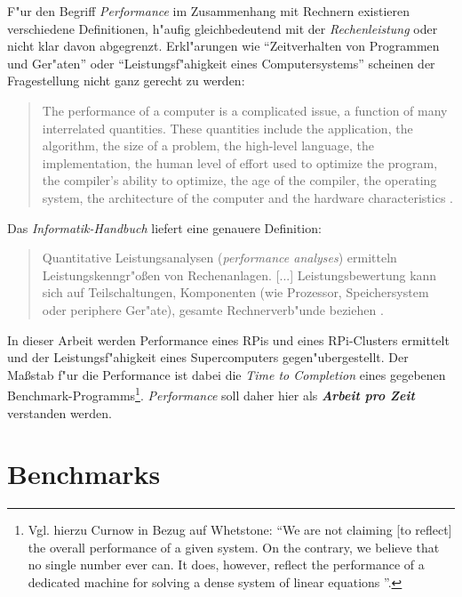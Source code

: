 F"ur den Begriff \textit{Performance} im Zusammenhang mit Rechnern existieren verschiedene Definitionen, h"aufig gleichbedeutend mit der \textit{Rechenleistung} oder nicht klar davon abgegrenzt. Erkl"arungen wie "`Zeitverhalten von Programmen und Ger"aten"' oder "`Leistungsf"ahigkeit eines Computersystems"' scheinen der Fragestellung nicht ganz gerecht zu werden: 
\begin{quote}
\onehalfspacing
The performance of a computer is a complicated issue, a function of many interrelated quantities. These quantities include the application, the algorithm, the size of a problem, the high-level language, the implementation, the human level of effort used to optimize the program, the compiler's ability to optimize, the age of the compiler, the operating system, the architecture of the computer and the hardware characteristics \cite{don03}.
\end{quote}
Das \textit{Informatik-Handbuch} liefert eine genauere Definition:
\begin{quote} 
\onehalfspacing
Quantitative Leistungsanalysen (\textit{performance analyses}) ermitteln Leistungskenngr"o\ss en von Rechenanlagen. [...] Leistungsbewertung kann sich auf Teilschaltungen, Komponenten (wie Prozessor, Speichersystem oder periphere Ger"ate), gesamte Rechnerverb"unde beziehen \cite{rec06}.
\end{quote}
In dieser Arbeit werden Performance eines RPis und eines RPi-Clusters ermittelt und der Leistungsf"ahigkeit eines Supercomputers gegen"ubergestellt. Der Ma\ss stab f"ur die Performance ist dabei die \textit{Time to Completion} eines gegebenen Benchmark-Programms\footnote{Vgl. hierzu Curnow in Bezug auf Whetstone: "`We are not claiming [to reflect] the overall performance of a given system. On the contrary, we believe that no single number ever can. It does, however, reflect the performance of a dedicated machine for solving a dense system of linear equations \cite{cur76}"'.}. \textit{Performance} soll daher hier als \textbf{\textit{Arbeit pro Zeit}} verstanden werden. 

\section{Benchmarks}\label{Benchmarks}

